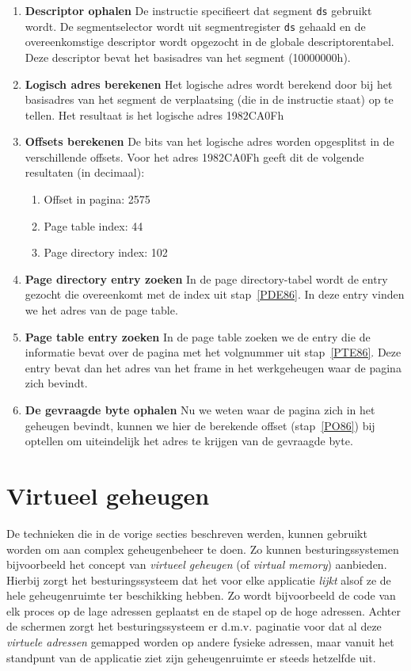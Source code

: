 \begin{enumerate}
\item{\textbf{Descriptor ophalen}} De instructie specifieert dat segment \texttt{ds} gebruikt wordt. De segmentselector wordt uit segmentregister \texttt{ds} gehaald en de overeenkomstige descriptor wordt opgezocht in de globale descriptorentabel. Deze descriptor bevat het basisadres van het segment (10000000h).
\item{\textbf{Logisch adres berekenen}} Het logische adres wordt berekend door bij het basisadres van het segment de verplaatsing (die in de instructie staat) op te tellen. Het resultaat is het logische adres 1982CA0Fh
\item{\textbf{Offsets berekenen}} De bits van het logische adres worden opgesplitst in de verschillende offsets. Voor het adres 1982CA0Fh geeft dit de volgende resultaten (in decimaal):
    \begin{enumerate}
    \item{Offset in pagina:}\label{PO86} 2575
    \item{Page table index:}\label{PTE86} 44
    \item{Page directory index:}\label{PDE86} 102
    \end{enumerate}
\item{\textbf{Page directory entry zoeken}} In de page directory-tabel wordt de entry gezocht die overeenkomt met de index uit stap~\ref{PDE86}. In deze entry vinden we het adres van de page table.
\item{\textbf{Page table entry zoeken}} In de page table zoeken we de entry die de informatie bevat over de pagina met het volgnummer uit stap~\ref{PTE86}. Deze entry bevat dan het adres van het frame in het werkgeheugen waar de pagina zich bevindt.
\item{\textbf{De gevraagde byte ophalen}} Nu we weten waar de pagina zich in het geheugen bevindt, kunnen we hier de berekende offset (stap~\ref{PO86}) bij optellen om uiteindelijk het adres te krijgen van de gevraagde byte.
\end{enumerate}

\section{Virtueel geheugen}

De technieken die in de vorige secties beschreven werden, kunnen gebruikt worden om aan complex geheugenbeheer te doen. Zo kunnen besturingssystemen bijvoorbeeld het concept van \emph{virtueel geheugen} (of \emph{virtual memory}) aanbieden. Hierbij zorgt het besturingssysteem dat het voor elke applicatie \emph{lijkt} alsof ze de hele geheugenruimte ter beschikking hebben. Zo wordt bijvoorbeeld de code van elk proces op de lage adressen geplaatst en de stapel op de hoge adressen. Achter de schermen zorgt het besturingssysteem er d.m.v. paginatie voor dat al deze \emph{virtuele adressen} gemapped worden op andere fysieke adressen, maar vanuit het standpunt van de applicatie ziet zijn geheugenruimte er steeds hetzelfde uit.


